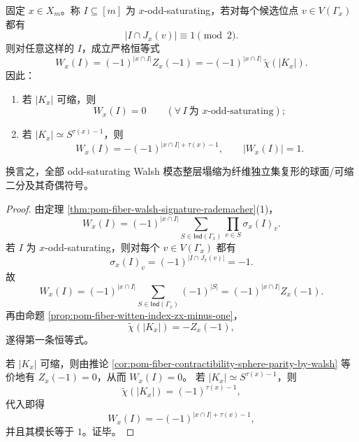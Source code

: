 \begin{theorem}\label{thm:conclusion-fold-odd-saturating-walsh-euler-sphere-collapse}
固定 \(x\in X_m\)。称 \(I\subseteq[m]\) 为 \(x\)-odd-saturating，若对每个候选位点 \(v\in V(\Gamma_x)\) 都有
\[
|I\cap J_x(v)|\equiv 1\pmod 2.
\]
则对任意这样的 \(I\)，成立严格恒等式
\[
W_x(I)=(-1)^{|x\cap I|}Z_x(-1)
=-(-1)^{|x\cap I|}\,\widetilde\chi(|K_x|).
\]
因此：
\begin{enumerate}
  \item 若 \(|K_x|\) 可缩，则
  \[
  W_x(I)=0
  \qquad (\forall\,I\ \text{为 }x\text{-odd-saturating});
  \]
  \item 若 \(|K_x|\simeq S^{\tau(x)-1}\)，则
  \[
  W_x(I)=-(-1)^{|x\cap I|+\tau(x)-1},
  \qquad
  |W_x(I)|=1.
  \]
\end{enumerate}
换言之，全部 odd-saturating Walsh 模态整层塌缩为纤维独立集复形的球面/可缩二分及其奇偶符号。
\end{theorem}
\begin{proof}
由定理 \ref{thm:pom-fiber-walsh-signature-rademacher}(1)，
\[
W_x(I)=(-1)^{|x\cap I|}
\sum_{S\in\mathsf{Ind}(\Gamma_x)}\prod_{v\in S}\sigma_x(I)_v.
\]
若 \(I\) 为 \(x\)-odd-saturating，则对每个 \(v\in V(\Gamma_x)\) 都有
\[
\sigma_x(I)_v=(-1)^{|I\cap J_x(v)|}=-1.
\]
故
\[
W_x(I)=(-1)^{|x\cap I|}
\sum_{S\in\mathsf{Ind}(\Gamma_x)}(-1)^{|S|}
=(-1)^{|x\cap I|}Z_x(-1).
\]
再由命题 \ref{prop:pom-fiber-witten-index-zx-minus-one}，
\[
\widetilde\chi(|K_x|)=-Z_x(-1),
\]
遂得第一条恒等式。

若 \(|K_x|\) 可缩，则由推论 \ref{cor:pom-fiber-contractibility-sphere-parity-by-walsh} 等价地有 \(Z_x(-1)=0\)，从而 \(W_x(I)=0\)。
若 \(|K_x|\simeq S^{\tau(x)-1}\)，则
\[
\widetilde\chi(|K_x|)=(-1)^{\tau(x)-1},
\]
代入即得
\[
W_x(I)=-(-1)^{|x\cap I|+\tau(x)-1},
\]
并且其模长等于 \(1\)。证毕。
\end{proof}

